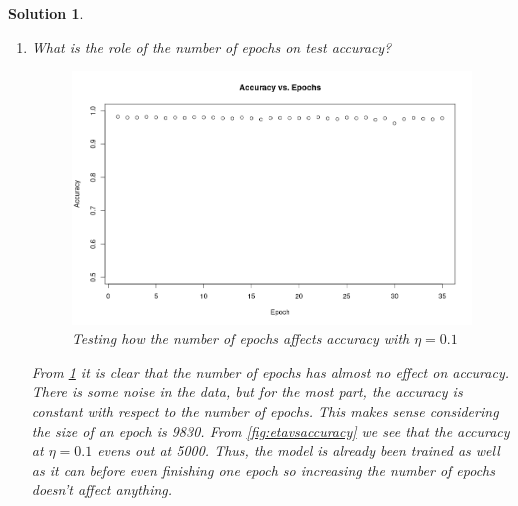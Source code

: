 \documentclass[12pt]{article}
\newtheorem*{solution*}{Solution}
\theoremstyle{definition}
\begin{document}
\begin{solution*}
\begin{enumerate}[label=\arabic*.,font=\upshape]
			\item \textnormal{What is the role of the number of epochs on test accuracy?}
			\begin{figure}[H]
				\centering
				\includegraphics[scale=0.4]{EpochVsAccuracy}
				\caption{Testing how the number of epochs affects accuracy with $\eta = 0.1$}
				\label{fig:epochvsaccuracy}
			\end{figure}
			From \cref{fig:epochvsaccuracy} it is clear that the number of epochs has almost no effect on accuracy. There is some noise in the data, but for the most part, the accuracy is constant with respect to the number of epochs. This makes sense considering the size of an epoch is 9830. From \cref{fig:etavsaccuracy} we see that the accuracy at $\eta = 0.1$ evens out at 5000. Thus, the model is already been trained as well as it can before even finishing one epoch so increasing the number of epochs doesn't affect anything. 
		\end{enumerate}
	\end{solution*}
\end{document}
